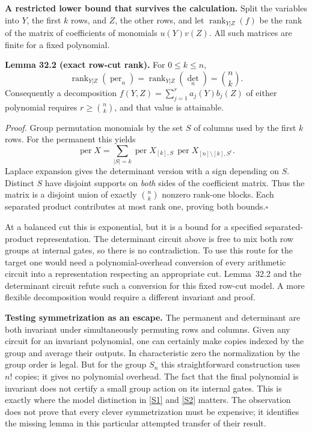 \documentclass[11pt,a4paper]{article}
\newcommand{\sref}[2]{\hyperlink{source:#1:#2}{[S#2]}}
\numberwithin{equation}{section}
\begin{document}
\medskip
\textbf{A restricted lower bound that survives the calculation.}
Split the variables into $Y$, the first $k$ rows, and $Z$, the other rows,
and let $\operatorname{rank}_{Y|Z}(f)$ be the rank of the matrix of coefficients
of monomials $u(Y)v(Z)$. All such matrices are finite for a fixed polynomial.

\textbf{Lemma 32.2 (exact row-cut rank).}
For $0\le k\le n$,
\begin{equation}\label{r32:cut}
 \operatorname{rank}_{Y|Z}(\operatorname{per}_n)
 =\operatorname{rank}_{Y|Z}(\det_n)=\binom nk.
\end{equation}
Consequently a decomposition
$f(Y,Z)=\sum_{j=1}^r a_j(Y)b_j(Z)$ of either polynomial requires
$r\ge\binom nk$, and that value is attainable.

\emph{Proof.} Group permutation monomials by the set $S$ of columns used
by the first $k$ rows. For the permanent this yields
\[
 \operatorname{per}X=\sum_{|S|=k}
     \operatorname{per}X_{[k],S}\,
     \operatorname{per}X_{[n]\setminus[k],S^c}.
\]
Laplace expansion gives the determinant version with a sign depending on
$S$. Distinct $S$ have disjoint supports on \emph{both} sides of the
coefficient matrix. Thus the matrix is a disjoint union of exactly
$\binom nk$ nonzero rank-one blocks. Each separated product contributes
at most rank one, proving both bounds.\hfill$\square$

At a balanced cut this is exponential, but it is a bound for a specified
separated-product representation. The determinant circuit above is free
to mix both row groups at internal gates, so there is no contradiction.
To use this route for the target one would need a polynomial-overhead
conversion of every arithmetic circuit into a representation respecting
an appropriate cut. Lemma~32.2 and the determinant circuit refute such a
conversion for this fixed row-cut model. A more flexible decomposition
would require a different invariant and proof.

\medskip
\textbf{Testing symmetrization as an escape.}
The permanent and determinant are both invariant under simultaneously
permuting rows and columns. Given any circuit for an invariant polynomial,
one can certainly make copies indexed by the group and average their
outputs. In characteristic zero the normalization by the group order is
legal. But for the group $S_n$ this straightforward construction uses
$n!$ copies; it gives no polynomial overhead. The fact that the final
polynomial is invariant does not certify a small group action on its
internal gates. This is exactly where the model distinction in
\sref{statement}{1} and \sref{statement}{2} matters. The observation does not prove that
every clever symmetrization must be expensive; it identifies the missing
lemma in this particular attempted transfer of their result.
\end{document}
